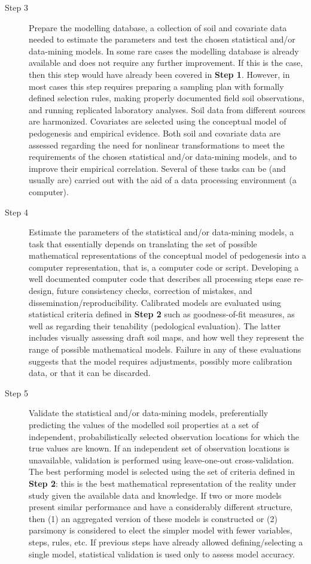 \begin{description}
\item[Step 3] Prepare the modelling database, a collection of soil and covariate data needed to estimate the 
parameters and test the chosen statistical and/or data-mining models. In some rare cases the modelling 
database is already available and does not require any further improvement. If this is the case, then this 
step would have already been covered in \textbf{Step 1}. However, in most cases this step requires preparing a
sampling plan with formally defined selection rules, making properly documented field soil observations, and 
running replicated laboratory analyses. Soil data from different sources are harmonized. Covariates are 
selected using the conceptual model of pedogenesis and empirical evidence. Both soil and covariate data are 
assessed regarding the need for nonlinear transformations to meet the requirements of the chosen statistical 
and/or data-mining models, and to improve their empirical correlation. Several of these tasks can be (and
usually are) carried out with the aid of a data processing environment (a computer).

\item[Step 4] Estimate the parameters of the statistical and/or data-mining models, a task that essentially 
depends on translating the set of possible mathematical representations of the conceptual model of pedogenesis 
into a computer representation, that is, a computer code or script. Developing a well documented computer code 
that describes all processing steps ease re-design, future consistency checks, correction of mistakes, and 
dissemination/reproducibility. Calibrated models are evaluated using statistical criteria defined in 
\textbf{Step 2} such as goodness-of-fit measures, as well as regarding their tenability (pedological 
evaluation). The latter includes visually assessing draft soil maps, and how well they represent the range of 
possible mathematical models. Failure in any of these evaluations suggests that the model requires adjustments,
possibly more calibration data, or that it can be discarded.

\item[Step 5] Validate the statistical and/or data-mining models, preferentially predicting the values of the 
modelled soil properties at a set of independent, probabilistically selected observation locations for which 
the true values are known. If an independent set of observation locations is unavailable, validation is 
performed using leave-one-out cross-validation. The best performing model is selected using the set of criteria
defined in \textbf{Step 2}: this is the best mathematical representation of the reality under study given the 
available data and knowledge. If two or more models present similar performance and have a considerably 
different structure, then (1) an aggregated version of these models is constructed or (2) parsimony is 
considered to elect the simpler model with fewer variables, steps, rules, etc. If previous steps have already 
allowed defining/selecting a single model, statistical validation is used only to assess model accuracy.


\end{description}
